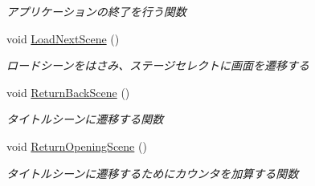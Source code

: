 \begin{DoxyCompactItemize}
\begin{DoxyCompactList}\small\item\em アプリケーションの終了を行う関数 \end{DoxyCompactList}\item 
void \hyperlink{class_title_a78ccd194042c8a8a5bc9ea22d30f0b62}{Load\+Next\+Scene} ()
\begin{DoxyCompactList}\small\item\em ロードシーンをはさみ、ステージセレクトに画面を遷移する \end{DoxyCompactList}\item 
void \hyperlink{class_title_acee6703092dc812e12d65a9b003670ec}{Return\+Back\+Scene} ()
\begin{DoxyCompactList}\small\item\em タイトルシーンに遷移する関数 \end{DoxyCompactList}\item 
void \hyperlink{class_title_a6d366ededddff41323515352d058b24a}{Return\+Opening\+Scene} ()
\begin{DoxyCompactList}\small\item\em タイトルシーンに遷移するためにカウンタを加算する関数 \end{DoxyCompactList}\end{DoxyCompactItemize}
